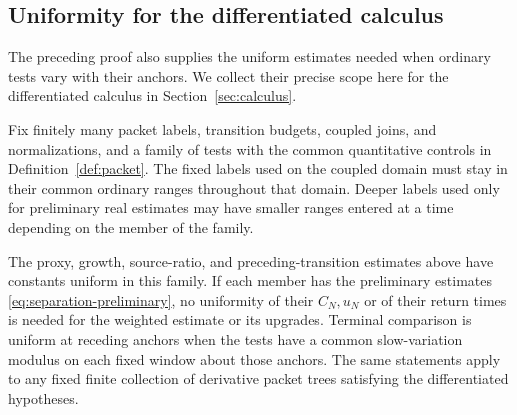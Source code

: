 \subsection{Uniformity for the differentiated calculus}

The preceding proof also supplies the uniform estimates needed when
ordinary tests vary with their anchors.  We collect their precise scope
here for the differentiated calculus in Section~\ref{sec:calculus}.

\begin{lemma}
\label{lem:separation-family-uniformity}
Fix finitely many packet labels, transition budgets, coupled
joins, and normalizations, and a family of tests with the common
quantitative controls in Definition~\ref{def:packet}.  The fixed
labels used on the coupled domain must stay in their common
ordinary ranges throughout that domain.  Deeper labels used
only for preliminary real estimates may have smaller ranges
entered at a time depending on the member of the family.

The proxy, growth, source-ratio, and preceding-transition
estimates above have constants uniform in this family.  If
each member has the preliminary estimates
\eqref{eq:separation-preliminary}, no uniformity of their
$C_N,u_N$ or of their return times is needed for the weighted
estimate or its upgrades.  Terminal comparison is uniform at
receding anchors when the tests have a common slow-variation
modulus on each fixed window about those anchors.  The same
statements apply to any fixed finite collection of derivative
packet trees satisfying the differentiated hypotheses.
\end{lemma}

